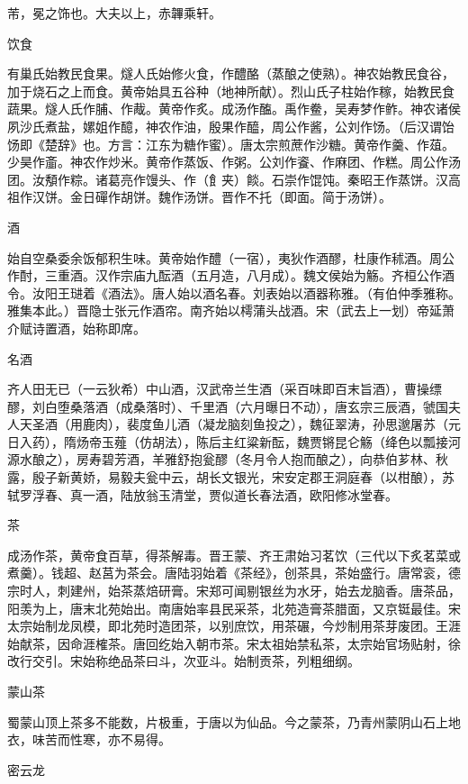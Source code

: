 \documentclass[a4paper,12pt,UTF8,twoside]{ctexbook}
\begin{document}
    芾，冕之饰也。大夫以上，赤韠乘轩。
    
    饮食
    
    有巢氏始教民食果。燧人氏始修火食，作醴酪（蒸酿之使熟）。神农始教民食谷，加于烧石之上而食。黄帝始具五谷种（地神所献）。烈山氏子柱始作稼，始教民食蔬果。燧人氏作脯、作胾。黄帝作炙。成汤作醢。禹作鲞，吴寿梦作鲊。神农诸侯夙沙氏煮盐，嫘姐作醷，神农作油，殷果作醯，周公作酱，公刘作饧。（后汉谓饴饧即《楚辞》也。方言：江东为糖作蜜）。唐太宗煎蔗作沙糖。黄帝作羹、作葅。少昊作齑。神农作炒米。黄帝作蒸饭、作粥。公刘作餈、作麻团、作糕。周公作汤团。汝頺作粽。诸葛亮作馒头、作（飠夹）餤。石崇作馄饨。秦昭王作蒸饼。汉高祖作汉饼。金日磾作胡饼。魏作汤饼。晋作不托（即面。简于汤饼）。
    
    酒
    
    始自空桑委余饭郁积生味。黄帝始作醴（一宿），夷狄作酒醪，杜康作秫酒。周公作酎，三重酒。汉作宗庙九酝酒（五月造，八月成）。魏文侯始为觞。齐桓公作酒令。汝阳王琎着《酒法》。唐人始以酒名春。刘表始以酒器称雅。（有伯仲季雅称。雅集本此。）晋隐士张元作酒帘。南齐始以樗蒲头战酒。宋（武去上一划）帝延萧介赋诗置酒，始称即席。
    
    名酒
    
    齐人田无已（一云狄希）中山酒，汉武帝兰生酒（采百味即百末旨酒），曹操缥醪，刘白堕桑落酒（成桑落时）、千里酒（六月曝日不动），唐玄宗三辰酒，虢国夫人天圣酒（用鹿肉），裴度鱼儿酒（凝龙脑刻鱼投之），魏征翠涛，孙思邈屠苏（元日入药），隋炀帝玉薤（仿胡法），陈后主红粱新酝，魏贾锵昆仑觞（绛色以瓢接河源水酿之），房寿碧芳酒，羊雅舒抱瓮醪（冬月令人抱而酿之），向恭伯芗林、秋露，殷子新黄娇，易毅夫瓮中云，胡长文银光，宋安定郡王洞庭春（以柑酿），苏轼罗浮春、真一酒，陆放翁玉清堂，贾似道长春法酒，欧阳修冰堂春。
    
    茶
    
    成汤作茶，黄帝食百草，得茶解毒。晋王蒙、齐王肃始习茗饮（三代以下炙茗菜或煮羹）。钱超、赵莒为茶会。唐陆羽始着《茶经》，创茶具，茶始盛行。唐常衮，德宗时人，刺建州，始茶蒸焙研膏。宋郑可闻剔银丝为水牙，始去龙脑香。唐茶品，阳羡为上，唐末北苑始出。南唐始率县民采茶，北苑造膏茶腊面，又京铤最佳。宋太宗始制龙凤模，即北苑时造团茶，以别庶饮，用茶碾，今炒制用茶芽废团。王涯始献茶，因命涯榷茶。唐回纥始入朝市茶。宋太祖始禁私茶，太宗始官场贴射，徐改行交引。宋始称绝品茶曰斗，次亚斗。始制贡茶，列粗细纲。
    
    蒙山茶
    
    蜀蒙山顶上茶多不能数，片极重，于唐以为仙品。今之蒙茶，乃青州蒙阴山石上地衣，味苦而性寒，亦不易得。
    
    密云龙
    
\end{document}

